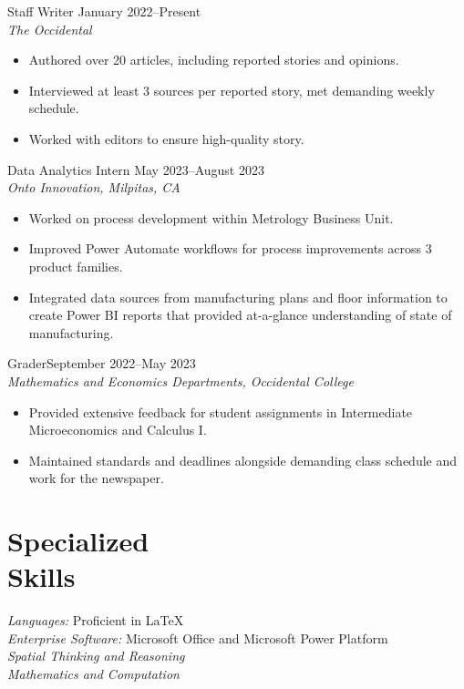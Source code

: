 \documentclass[margin, 12pt]{res} %
\begin{document}
\begin{resume}
Staff Writer \hfill January 2022--Present \\
\textit{The Occidental} 
\begin{itemize} \itemsep -2pt
  \item Authored over 20 articles, including reported stories and opinions.
  \item Interviewed at least 3 sources per reported story, met demanding weekly schedule.
  \item Worked with editors to ensure high-quality story.
\end{itemize} 

{Data Analytics Intern} \hfill May 2023--August 2023 \\
\textit{Onto Innovation, Milpitas, CA}
\begin{itemize} \itemsep -2pt %
  \item Worked on process development within Metrology Business Unit.
  \item Improved Power Automate workflows for process improvements across 3 product families.
  \item Integrated data sources from manufacturing plans and floor information to create Power BI reports that provided at-a-glance understanding of state of manufacturing.
\end{itemize}

Grader\hfill September 2022--May 2023\\
\textit{Mathematics and Economics Departments, Occidental College}
\begin{itemize}\itemsep -2pt
  \item Provided extensive feedback for student assignments in Intermediate Microeconomics and Calculus I.
  \item Maintained standards and deadlines alongside demanding class schedule and work for the newspaper.
\end{itemize}


\section{\sc Specialized \\ Skills} 

{\sl Languages:} Proficient in \LaTeX\\%
{\sl Enterprise Software:} Microsoft Office and Microsoft Power Platform\\
{\sl Spatial Thinking and Reasoning}\\
{\sl Mathematics and Computation}

\end{resume}
\end{document}
